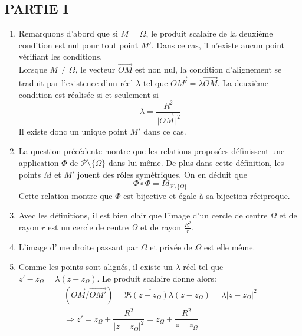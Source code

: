 \subsection*{PARTIE I}
\begin{enumerate}
 \item Remarquons d'abord que si $M=\Omega$, le produit scalaire de la deuxième condition est nul pour tout point $M'$. Dans ce cas, il n'existe aucun point vérifiant les conditions.\\
Lorsque $M\neq\Omega$, le vecteur $\overrightarrow{OM}$ est non nul, la condition d'alignement se traduit par l'existence d'un réel $\lambda$ tel que $\overrightarrow{OM'}=\lambda \overrightarrow{OM}$. La deuxième condition est réalisée si et seulement si
\begin{displaymath}
 \lambda = \dfrac{R^2}{\Vert \overrightarrow{OM}\Vert^2}
\end{displaymath}
Il existe donc un unique point $M'$ dans ce cas. 
\item La question précédente montre que les relations proposées définissent une application $\Phi$ de $\mathcal P\setminus\{\Omega\}$ dans lui même. De plus dans cette définition, les points $M$ et $M'$ jouent des rôles symétriques. On en déduit que
\begin{displaymath}
 \Phi \circ \Phi = Id_{\mathcal P\setminus\{\Omega\}}
\end{displaymath}
Cette relation montre que $\Phi$ est bijective et égale à sa bijection réciproque.
\item Avec les définitions, il est bien clair que l'image d'un cercle de centre $\Omega$ et de rayon $r$ est un cercle de centre $\Omega$ et de rayon $\frac{R^2}{r}$.
\item L'image d'une droite passant par $\Omega$ et privée de $\Omega$ est elle même.
\item Comme les points sont alignés, il existe un $\lambda$ réel tel que $z'-z_\Omega=\lambda(z-z_\Omega)$. Le produit scalaire donne alors:
\begin{multline*}
 (\overrightarrow{OM}/\overrightarrow{OM'})
=\Re\overline{(z-z_\Omega)}\lambda(z-z_\Omega)=\lambda |z-z_\Omega|^2 \\
\Rightarrow 
z' = z_\Omega+\dfrac{R^2}{|z-z_\Omega|^2}=z_\Omega + \dfrac{R^2}{\overline{z-z_\Omega}}
\end{multline*}

\end{enumerate}
